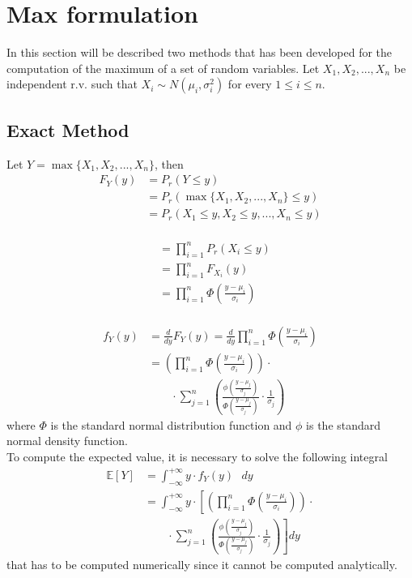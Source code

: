 \section{Max formulation}\label{max_formulation}

In this section will be described two methods that has been developed for the computation of the maximum of a set of random variables.
Let $X_1, X_2, ..., X_n$ be independent r.v. such that $X_i \sim N(\mu_i, \sigma_i^2)$ for every $1 \leq i \leq n.$

\subsection{Exact Method}
Let $Y = \max\{X_1, X_2, ..., X_n\}$, then
\begin{align*}
	F_Y(y) &= P_r(Y \leq y) \\
	&= P_r(\max\{X_1, X_2, ..., X_n\} \leq y) \\
	&= P_r(X_1 \leq y, X_2 \leq y, ..., X_n \leq y) \\
\end{align*}

\begin{align*}
&= \prod_{i = 1}^n P_r(X_i \leq y)  \tag*{(by indipendence of r.v)} \\
&= \prod_{i = 1}^n F_{X_i}(y)  \\
&= \prod_{i = 1}^n \Phi\left(\frac{y - \mu_i}{\sigma_i}\right) \\
\end{align*}

\begin{align*}
	f_Y(y) &= \frac{d}{dy} F_Y(y) = \frac{d}{dy} \prod_{i = 1}^n \Phi\left(\frac{y - \mu_i}{\sigma_i}\right) \\
	&= \left(\prod_{i = 1}^n \Phi\left(\frac{y - \mu_i}{\sigma_i}\right)\right) \cdot \\
	&\qquad \cdot \sum_{j = 1}^n \left(\frac{\phi\left(\frac{y - \mu_j}{\sigma_j}\right)}{\Phi\left(\frac{y - \mu_j}{\sigma_j}\right)} \cdot \frac{1}{\sigma_j}\right)
\end{align*}
where $\Phi$ is the standard normal distribution function and $\phi$ is the standard normal density function. \\
To compute the expected value, it is necessary to solve the following integral
\begin{align*}
	\mathbb{E}[Y] &= \int_{-\infty}^{+\infty} y \cdot f_Y(y)\text{ }dy \\
	&= \int_{-\infty}^{+\infty} y \cdot \left[\left(\prod_{i = 1}^n \Phi\left(\frac{y - \mu_i}{\sigma_i}\right)\right) \cdot \right. \\
	&\left. \qquad \cdot \sum_{j = 1}^n \left(\frac{\phi\left(\frac{y - \mu_j}{\sigma_j}\right)}{\Phi\left(\frac{y - \mu_j}{\sigma_j}\right)} \cdot \frac{1}{\sigma_j}\right)\right]dy
\end{align*}
that has to be computed numerically since it cannot be computed analytically.

